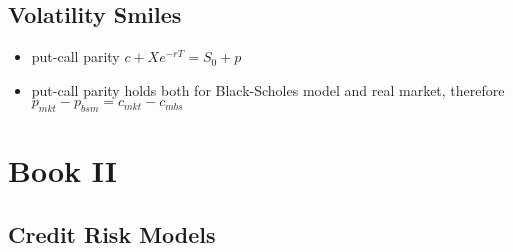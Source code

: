 \subsection{Volatility Smiles}
\begin{itemize}
	\item put-call parity $c + Xe^{-rT} = S_0 + p$
	\item put-call parity holds both for Black-Scholes model and real market, therefore $p_{mkt} - p_{bsm} = c_{mkt} - c_{mbs}$
\end{itemize}

\section{Book II}

\subsection{Credit Risk Models}
